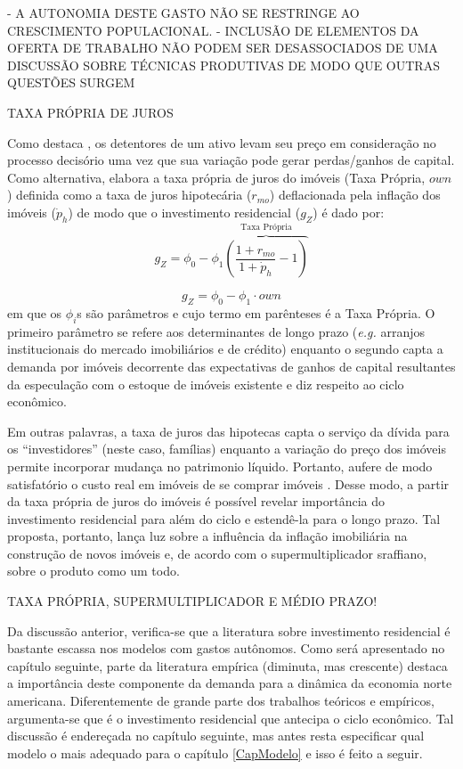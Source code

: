 - A AUTONOMIA DESTE GASTO NÃO SE RESTRINGE AO CRESCIMENTO POPULACIONAL.
- INCLUSÃO DE ELEMENTOS DA OFERTA DE TRABALHO NÃO PODEM SER DESASSOCIADOS DE UMA DISCUSSÃO SOBRE TÉCNICAS PRODUTIVAS DE MODO QUE OUTRAS QUESTÕES SURGEM

TAXA PRÓPRIA DE JUROS

Como destaca \textcite[p.~53]{teixeira_crescimento_2015}, os detentores de um ativo levam seu preço em consideração no processo decisório uma vez que sua variação pode gerar perdas/ganhos de capital. Como alternativa, elabora a taxa própria de juros do imóveis (Taxa Própria, $own$) definida como a taxa de juros hipotecária ($r_{mo}$) deflacionada pela inflação dos imóveis ({$\dot p_h$}) de modo que o investimento residencial ($g_Z$) é dado por:
$$
g_Z = \phi_0 - \phi_1 \overbrace{\left(\frac{1+r_{mo}}{1+\dot p_h} - 1\right)}^{\text{Taxa Própria}}
$$

\begin{equation}
g_Z = \phi_0 - \phi_1\cdot own
\end{equation}
em que os $\phi_i$s são parâmetros e cujo termo em parênteses é a Taxa Própria. 
O primeiro parâmetro se refere aos determinantes de longo prazo (\textit{e.g.} arranjos institucionais do mercado imobiliários e de crédito) enquanto o segundo capta a demanda por imóveis decorrente das expectativas de ganhos de capital resultantes da especulação com o estoque de imóveis existente e diz respeito ao ciclo econômico.

Em outras palavras, a taxa de juros das hipotecas capta o serviço da dívida para os ``investidores'' (neste caso, famílias) enquanto a variação do preço dos imóveis permite incorporar mudança no patrimonio líquido. Portanto, aufere de modo satisfatório o custo real em imóveis de se comprar imóveis \cite[p.~53]{teixeira_crescimento_2015}. Desse modo, a partir da taxa própria de juros do imóveis é possível revelar importância do investimento residencial para além do ciclo e estendê-la para o longo prazo.  Tal proposta, portanto, lança luz sobre a influência da inflação imobiliária na construção de novos imóveis e, de acordo com o supermultiplicador sraffiano, sobre o produto como um todo. 


TAXA PRÓPRIA, SUPERMULTIPLICADOR E MÉDIO PRAZO!

Da discussão anterior, verifica-se que a literatura sobre investimento residencial é bastante escassa nos modelos com gastos autônomos. Como será apresentado no capítulo seguinte, parte da literatura empírica (diminuta, mas crescente) destaca a importância deste componente da demanda para a dinâmica da economia norte americana. Diferentemente de grande parte dos trabalhos teóricos e empíricos, argumenta-se que é o investimento residencial que antecipa o ciclo econômico. Tal discussão é endereçada no capítulo seguinte, mas antes resta especificar qual modelo o mais adequado para o capítulo \ref{CapModelo} e isso é feito a seguir.
